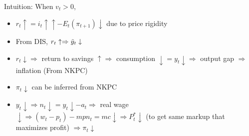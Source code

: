 \documentclass{article}
\begin{document}
{\color{ForestGreen}Intuition: When $v_t > 0$,
\begin{itemize}
    \item $r_t \uparrow = i_t \uparrow\uparrow - E_t(\pi_{t+1})\downarrow$ due to price rigidity
    \item From DIS, $r_t \uparrow \Rightarrow \Tilde{y}_t \downarrow$
    \item $r_t\downarrow\Rightarrow$ return to savings $\uparrow \Rightarrow$ consumption $\downarrow = y_t\downarrow \Rightarrow$ output gap  $\Rightarrow$ inflation  (From NKPC)
    \item $\pi_t \downarrow$ can be inferred from NKPC
    \item $y_t\downarrow\Rightarrow n_t\downarrow = y_t\downarrow - a_t \Rightarrow$ real wage $\downarrow \Rightarrow (w_t - p_t) - mpn_t = mc\downarrow \Rightarrow P_t^* \downarrow$ (to get same markup that maximizes profit) $\Rightarrow \pi_t \downarrow$
\end{itemize}
}
\end{document}
